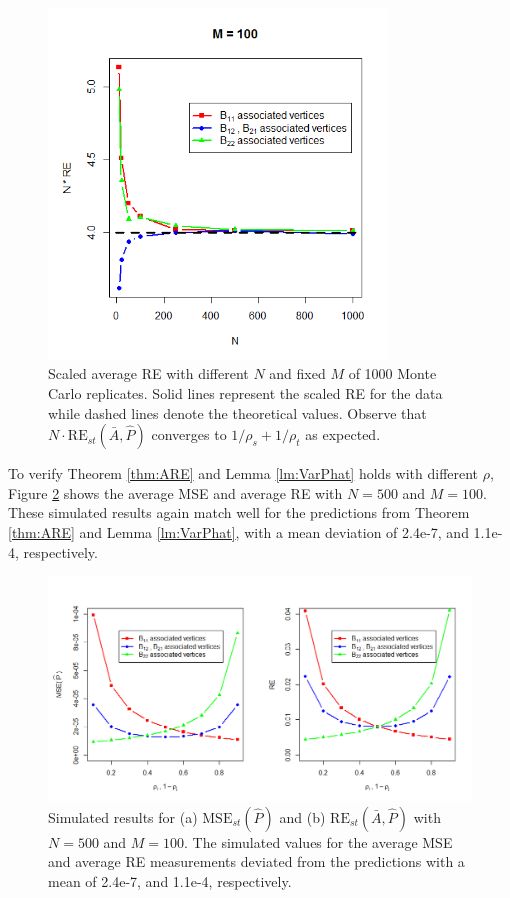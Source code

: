 \begin{figure}[!htb]
	\centering
	\includegraphics[width=9cm]{RE.png}
	\caption{Scaled average RE with different $N$ and fixed $M$ of 1000 Monte Carlo replicates. Solid lines represent the scaled RE for the data while dashed lines denote the theoretical values. Observe that $N \cdot \mathrm{RE}_{st}(\bar{A}, \hat{P})$ converges to $1/\rho_s + 1/\rho_t$ as expected.}
	\label{fig:RE}
\end{figure}




To verify Theorem \ref{thm:ARE} and Lemma \ref{lm:VarPhat} holds with different $\rho$, Figure \ref{fig:RErho} shows the average MSE and average RE with $N = 500$ and $M = 100$. These simulated results again match well for the predictions from Theorem \ref{thm:ARE} and Lemma \ref{lm:VarPhat}, with a mean deviation of 2.4e-7, and 1.1e-4, respectively.
\begin{figure}[!htb]
	\centering
	\includegraphics[width=14cm]{VarRE.PNG}
	\caption{Simulated results for (a) $\mathrm{MSE}_{st}(\hat{P})$ and (b) $\mathrm{RE}_{st}(\bar{A}, \hat{P})$ with $N = 500$ and $M = 100$. The simulated values for the average MSE and average RE measurements deviated from the predictions with a mean of 2.4e-7, and 1.1e-4, respectively.}
	\label{fig:RErho}
\end{figure}





